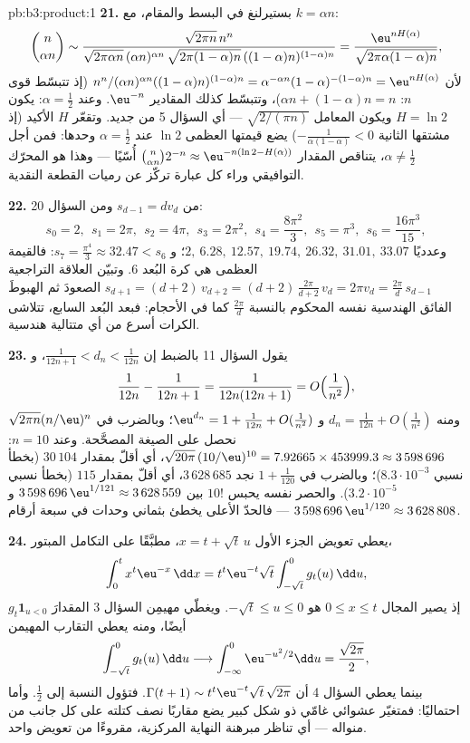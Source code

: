 \begin{solution}{pb:b3:product:1}
\textbf{21.} بستيرلنغ في البسط والمقام، مع $k =
\alpha n$:
\[
\binom n{\alpha n} \sim
\frac{\sqrt{2\pi n}\,n^n}
{\sqrt{2\pi\alpha n}\,(\alpha n)^{\alpha n}\,
\sqrt{2\pi(1-\alpha)n}\,((1-\alpha)n)^{(1-\alpha)n}}
= \frac{\eu^{nH(\alpha)}}{\sqrt{2\pi\alpha(1-\alpha)n}},
\]
لأن $n^n/(\alpha n)^{\alpha n}((1-\alpha)n)^{(1-\alpha)n} =
\alpha^{-\alpha n}(1-\alpha)^{-(1-\alpha)n} =
\eu^{nH(\alpha)}$ (إذ تتبسّط قوى $n$: $\alpha n +
(1-\alpha)n = n$)، وتتبسّط كذلك
المقادير $\eu^{-n}$. وعند
$\alpha = \frac12$: يكون $H = \ln2$ ويكون المعامل
$\sqrt{2/(\pi n)}$ --- أي السؤال 5 من جديد. وتقعّر $H$ الأكيد (إذ مشتقها
الثانية $-\frac1{\alpha(1-\alpha)} < 0$) يضع قيمتها العظمى $\ln 2$ عند $\alpha = \frac12$ وحدها:
فمن أجل $\alpha \neq \frac12$، يتناقص المقدار $\binom n{\alpha n}2^{-n} \approx
\eu^{-n(\ln2 - H(\alpha))}$ أُسّيًا --- وهذا هو
المحرّك التوافيقي وراء كل عبارة تركّز عن رميات القطعة النقدية.

\textbf{22.} من $s_{d-1} = dv_d$ ومن السؤال 20:
\[
s_0 = 2,\ \ s_1 = 2\pi,\ \ s_2 = 4\pi,\ \ s_3 = 2\pi^2,\ \
s_4 = \frac{8\pi^2}3,\ \ s_5 = \pi^3,\ \ s_6 =
\frac{16\pi^3}{15},
\]
وعدديًا $2,\ 6.28,\ 12.57,\ 19.74,\ 26.32,\ 31.01,\
33.07$؛ و $s_7 = \frac{\pi^4}3 \approx 32.47 < s_6$: فالقيمة العظمى هي كرة البُعد $6$.
وتبيّن العلاقة التراجعية $s_{d+1} =
(d+2)\,v_{d+2} = (d+2)\,\frac{2\pi}{d+2}\,v_d = 2\pi v_d =
\frac{2\pi}d\,s_{d-1}$ الصعودَ ثم الهبوطَ الفائق
الهندسية نفسه المحكوم بالنسبة $\frac{2\pi}d$ كما في الأحجام:
فبعد البُعد السابع، تتلاشى الكرات أسرع من أي متتالية هندسية.

\textbf{23.} يقول السؤال 11 بالضبط إن $\frac1{12n+1} < d_n <
\frac1{12n}$، و
\[
\frac1{12n} - \frac1{12n+1} = \frac1{12n(12n+1)} =
O\Bigl(\frac1{n^2}\Bigr),
\]
ومنه $d_n = \frac1{12n} + O(\frac1{n^2})$ و $\eu^{d_n} = 1 +
\frac1{12n} + O(\frac1{n^2})$؛ وبالضرب في
$\sqrt{2\pi n}(n/\eu)^n$ نحصل على الصيغة المصحَّحة. وعند $n =
10$: $\sqrt{20\pi}\,(10/\eu)^{10} = 7.92665 \times 453999.3
\approx 3\,598\,696$، أي
أقلّ بمقدار $30\,104$ (بخطأ نسبي
$8.3\cdot10^{-3}$)؛ وبالضرب في $1 + \frac1{120}$ نجد
$3\,628\,685$، أي أقلّ بمقدار $115$ (بخطأ نسبي
$3.2\cdot10^{-5}$). والحصر نفسه يحبس $10!$ بين
$3\,598\,696\,\eu^{1/121} \approx 3\,628\,559$ و
$3\,598\,696\,\eu^{1/120} \approx 3\,628\,808$ --- فالحدّ الأعلى يخطئ بثماني وحدات في سبعة أرقام.

\textbf{24.} يعطي تعويض الجزء الأول $x = t + \sqrt t\,u$،
مطبَّقًا على التكامل المبتور،
\[
\int_0^{t} x^{t}\eu^{-x}\,\dd x
= t^{t}\eu^{-t}\sqrt t\int_{-\sqrt t}^{0} g_t(u)\,\dd u ,
\]
إذ يصير المجال $0 \leq x \leq t$ هو $-\sqrt t \leq u \leq
0$. ويغطّي مهيمِن السؤال 3
المقدارَ $g_t\mathbf 1_{u < 0}$ أيضًا، ومنه يعطي التقارب المهيمن
\[
\int_{-\sqrt t}^{0}g_t(u)\,\dd u \longrightarrow
\int_{-\infty}^{0}\eu^{-u^2/2}\dd u = \frac{\sqrt{2\pi}}2 ,
\]
بينما يعطي السؤال 4 أن $\Gamma(t+1) \sim
t^t\eu^{-t}\sqrt t\,\sqrt{2\pi}$. فتؤول النسبة إلى
$\frac12$. وأما احتماليًا: فمتغيّر عشوائي غامّي ذو شكل كبير
يضع مقاربًا نصف كتلته على كل جانب من منواله --- أي تناظر مبرهنة
النهاية المركزية، مقروءًا من تعويض واحد.


\end{solution}
